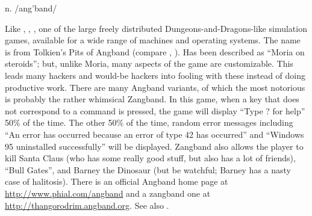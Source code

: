  n. /ang'band/

Like , , , one of the large freely distributed Dungeons-and-Dragons-like simulation
games, available for a wide range of machines and operating systems. The name is from Tolkien's Pits of Angband (compare , ). Has been described as ``Moria on steroids''; but, unlike Moria, many aspects of the game are customizable. This
leads many hackers and would-be hackers into fooling with these instead of doing productive work. There are many Angband variants, of which
the most notorious is probably the rather whimsical Zangband. In this game, when a key that does not correspond to a command is pressed, the
game will display ``Type ? for help'' 50\% of the time. The other 50\% of the time, random error messages including ``An error has occurred
because an error of type 42 has occurred'' and ``Windows 95 uninstalled successfully'' will be displayed. Zangband also allows the player to
kill Santa Claus (who has some really good stuff, but also has a lot of friends), ``Bull Gates'', and Barney the Dinosaur (but be watchful;
Barney has a nasty case of halitosis). There is an official Angband home page at \url{http://www.phial.com/angband} and a zangband one at
\url{http://thangorodrim.angband.org}. See also .

